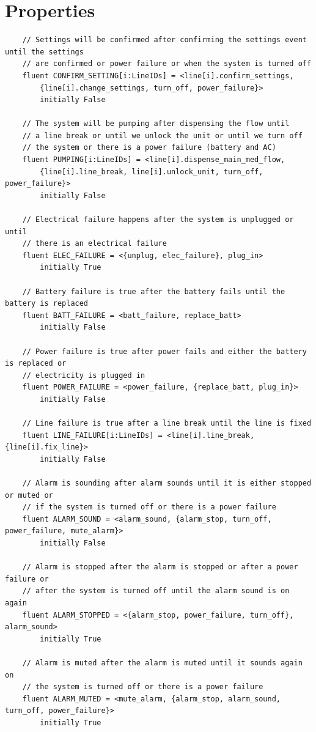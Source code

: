 \documentclass[titlepage]{article}
\begin{document}
\section{Properties}
\begin{verbatim}
    // Settings will be confirmed after confirming the settings event until the settings
    // are confirmed or power failure or when the system is turned off
    fluent CONFIRM_SETTING[i:LineIDs] = <line[i].confirm_settings,
        {line[i].change_settings, turn_off, power_failure}> 
        initially False
 
    // The system will be pumping after dispensing the flow until 
    // a line break or until we unlock the unit or until we turn off 
    // the system or there is a power failure (battery and AC)
    fluent PUMPING[i:LineIDs] = <line[i].dispense_main_med_flow,
        {line[i].line_break, line[i].unlock_unit, turn_off, power_failure}>
        initially False
        
    // Electrical failure happens after the system is unplugged or until 
    // there is an electrical failure
    fluent ELEC_FAILURE = <{unplug, elec_failure}, plug_in> 
        initially True
    
    // Battery failure is true after the battery fails until the battery is replaced
    fluent BATT_FAILURE = <batt_failure, replace_batt> 
        initially False

    // Power failure is true after power fails and either the battery is replaced or
    // electricity is plugged in
    fluent POWER_FAILURE = <power_failure, {replace_batt, plug_in}> 
        initially False
    
    // Line failure is true after a line break until the line is fixed
    fluent LINE_FAILURE[i:LineIDs] = <line[i].line_break, {line[i].fix_line}>
        initially False
        
    // Alarm is sounding after alarm sounds until it is either stopped or muted or
    // if the system is turned off or there is a power failure
    fluent ALARM_SOUND = <alarm_sound, {alarm_stop, turn_off, power_failure, mute_alarm}>
        initially False
    
    // Alarm is stopped after the alarm is stopped or after a power failure or 
    // after the system is turned off until the alarm sound is on again
    fluent ALARM_STOPPED = <{alarm_stop, power_failure, turn_off}, alarm_sound>
        initially True
    
    // Alarm is muted after the alarm is muted until it sounds again on 
    // the system is turned off or there is a power failure
    fluent ALARM_MUTED = <mute_alarm, {alarm_stop, alarm_sound, turn_off, power_failure}>
        initially True
    

\end{verbatim}
\end{document}
